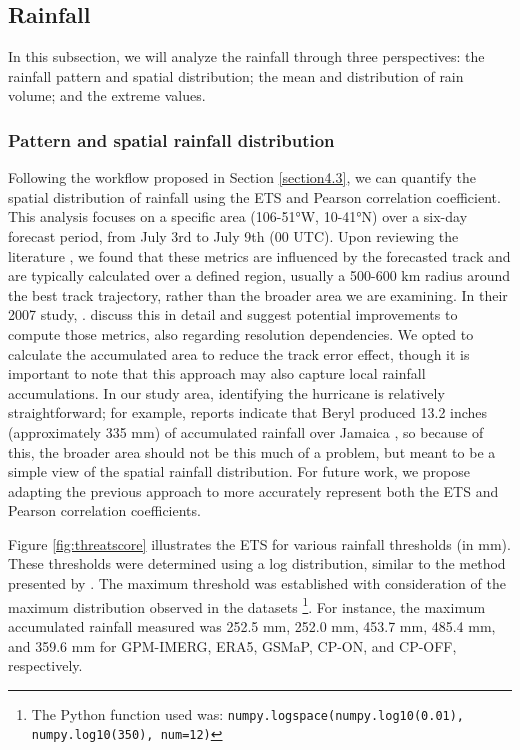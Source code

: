 \subsection{Rainfall}

In this subsection, we will analyze the rainfall through three perspectives: the rainfall pattern and spatial distribution; the mean and distribution of rain volume; and the extreme values. 

\subsubsection{Pattern and spatial rainfall distribution}

Following the workflow proposed in Section \ref{section4.3}, we can quantify the spatial distribution of rainfall using the ETS and Pearson correlation coefficient. This analysis focuses on a specific area (106-51°W, 10-41°N) over a six-day forecast period, from July 3rd to July 9th (00 UTC). Upon reviewing the literature \cite{marchok2007validation, brackins2020evaluation, luitel2018verification}, we found that these metrics are influenced by the forecasted track and are typically calculated over a defined region, usually a 500-600 km radius around the best track trajectory, rather than the broader area we are examining. In their 2007 study, . discuss this in detail and suggest potential improvements to compute those metrics, also regarding resolution dependencies. We opted to calculate the accumulated area to reduce the track error effect, though it is important to note that this approach may also capture local rainfall accumulations. In our study area, identifying the hurricane is relatively straightforward; for example, reports indicate that Beryl produced 13.2 inches (approximately 335 mm) of accumulated rainfall over Jamaica \cite{li2025generative}, so because of this, the broader area should not be this much of a problem, but meant to be a simple view of the spatial rainfall distribution. For future work, we propose adapting the previous approach to more accurately represent both the ETS and Pearson correlation coefficients.

Figure \ref{fig:threatscore} illustrates the ETS for various rainfall thresholds (in mm). These thresholds were determined using a log distribution, similar to the method presented by . The maximum threshold was established with consideration of the maximum distribution observed in the datasets \footnote{The Python function used was: \texttt{numpy.logspace(numpy.log10(0.01), numpy.log10(350), num=12)}}. For instance, the maximum accumulated rainfall measured was 252.5 mm, 252.0 mm, 453.7 mm, 485.4 mm, and 359.6 mm for GPM-IMERG, ERA5, GSMaP, CP-ON, and CP-OFF, respectively.

